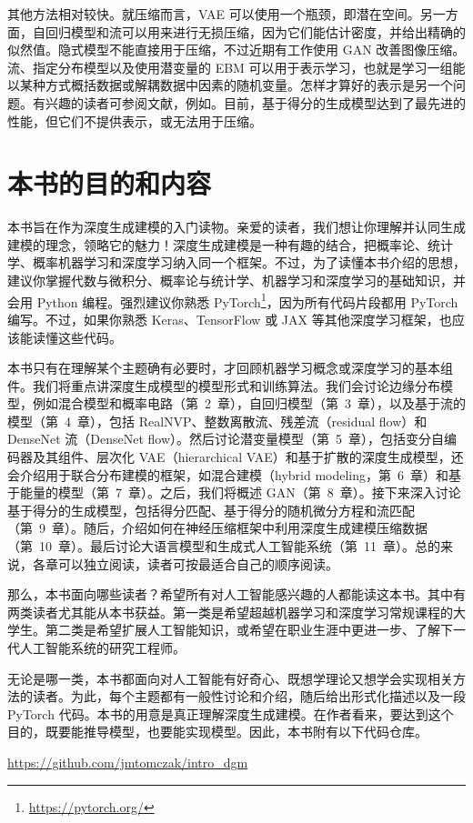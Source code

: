 其他方法相对较快。就压缩而言，VAE 可以使用一个瓶颈，即潜在空间。另一方面，自回归模型和流可以用来进行无损压缩，因为它们能估计密度，并给出精确的似然值。隐式模型不能直接用于压缩，不过近期有工作使用 GAN 改善图像压缩。流、指定分布模型以及使用潜变量的 EBM 可以用于表示学习，也就是学习一组能以某种方式概括数据或解耦数据中因素的随机变量。怎样才算好的表示是另一个问题。有兴趣的读者可参阅文献，例如。目前，基于得分的生成模型达到了最先进的性能，但它们不提供表示，或无法用于压缩。

\section{本书的目的和内容}
\label{sec:purpose}
本书旨在作为深度生成建模的入门读物。亲爱的读者，我们想让你理解并认同生成建模的理念，领略它的魅力！深度生成建模是一种有趣的结合，把概率论、统计学、概率机器学习和深度学习纳入同一个框架。不过，为了读懂本书介绍的思想，建议你掌握代数与微积分、概率论与统计学、机器学习和深度学习的基础知识，并会用 Python 编程。强烈建议你熟悉 PyTorch\footnote{\url{https://pytorch.org/}}，因为所有代码片段都用 PyTorch 编写。不过，如果你熟悉 Keras、TensorFlow 或 JAX 等其他深度学习框架，也应该能读懂这些代码。

本书只有在理解某个主题确有必要时，才回顾机器学习概念或深度学习的基本组件。我们将重点讲深度生成模型的模型形式和训练算法。我们会讨论边缘分布模型，例如混合模型和概率电路（第~2~章），自回归模型（第~3~章），以及基于流的模型（第~4~章），包括 RealNVP、整数离散流、残差流（residual flow）和 DenseNet 流（DenseNet flow）。然后讨论潜变量模型（第~5~章），包括变分自编码器及其组件、层次化 VAE（hierarchical VAE）和基于扩散的深度生成模型，还会介绍用于联合分布建模的框架，如混合建模（hybrid modeling，第~6~章）和基于能量的模型（第~7~章）。之后，我们将概述 GAN（第~8~章）。接下来深入讨论基于得分的生成模型，包括得分匹配、基于得分的随机微分方程和流匹配（第~9~章）。随后，介绍如何在神经压缩框架中利用深度生成建模压缩数据（第~10~章）。最后讨论大语言模型和生成式人工智能系统（第~11~章）。总的来说，各章可以独立阅读，读者可按最适合自己的顺序阅读。

那么，本书面向哪些读者？希望所有对人工智能感兴趣的人都能读这本书。其中有两类读者尤其能从本书获益。第一类是希望超越机器学习和深度学习常规课程的大学生。第二类是希望扩展人工智能知识，或希望在职业生涯中更进一步、了解下一代人工智能系统的研究工程师。

无论是哪一类，本书都面向对人工智能有好奇心、既想学理论又想学会实现相关方法的读者。为此，每个主题都有一般性讨论和介绍，随后给出形式化描述以及一段 PyTorch 代码。本书的用意是真正理解深度生成建模。在作者看来，要达到这个目的，既要能推导模型，也要能实现模型。因此，本书附有以下代码仓库。
\begin{center}
\url{https://github.com/jmtomczak/intro_dgm}
\end{center}


